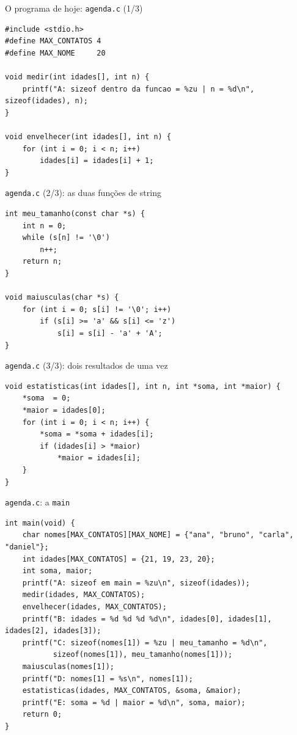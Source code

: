 \documentclass[aspectratio=169]{beamer}
\begin{document}
\begin{frame}[fragile]{O programa de hoje: \texttt{agenda.c} (1/3)}
\begin{lstlisting}[basicstyle=\ttfamily\scriptsize]
#include <stdio.h>
#define MAX_CONTATOS 4
#define MAX_NOME     20

void medir(int idades[], int n) {
    printf("A: sizeof dentro da funcao = %zu | n = %d\n", sizeof(idades), n);
}

void envelhecer(int idades[], int n) {
    for (int i = 0; i < n; i++)
        idades[i] = idades[i] + 1;
}
\end{lstlisting}
\end{frame}

\begin{frame}[fragile]{\texttt{agenda.c} (2/3): as duas funções de string}
\begin{lstlisting}[basicstyle=\ttfamily\scriptsize]
int meu_tamanho(const char *s) {
    int n = 0;
    while (s[n] != '\0')
        n++;
    return n;
}

void maiusculas(char *s) {
    for (int i = 0; s[i] != '\0'; i++)
        if (s[i] >= 'a' && s[i] <= 'z')
            s[i] = s[i] - 'a' + 'A';
}
\end{lstlisting}
\end{frame}

\begin{frame}[fragile]{\texttt{agenda.c} (3/3): dois resultados de uma vez}
\begin{lstlisting}[basicstyle=\ttfamily\scriptsize]
void estatisticas(int idades[], int n, int *soma, int *maior) {
    *soma  = 0;
    *maior = idades[0];
    for (int i = 0; i < n; i++) {
        *soma = *soma + idades[i];
        if (idades[i] > *maior)
            *maior = idades[i];
    }
}
\end{lstlisting}
\end{frame}

\begin{frame}[fragile]{\texttt{agenda.c}: a \texttt{main}}
\begin{lstlisting}[basicstyle=\ttfamily\scriptsize]
int main(void) {
    char nomes[MAX_CONTATOS][MAX_NOME] = {"ana", "bruno", "carla", "daniel"};
    int idades[MAX_CONTATOS] = {21, 19, 23, 20};
    int soma, maior;
    printf("A: sizeof em main = %zu\n", sizeof(idades));
    medir(idades, MAX_CONTATOS);
    envelhecer(idades, MAX_CONTATOS);
    printf("B: idades = %d %d %d %d\n", idades[0], idades[1], idades[2], idades[3]);
    printf("C: sizeof(nomes[1]) = %zu | meu_tamanho = %d\n",
           sizeof(nomes[1]), meu_tamanho(nomes[1]));
    maiusculas(nomes[1]);
    printf("D: nomes[1] = %s\n", nomes[1]);
    estatisticas(idades, MAX_CONTATOS, &soma, &maior);
    printf("E: soma = %d | maior = %d\n", soma, maior);
    return 0;
}
\end{lstlisting}
\end{frame}
\end{document}
